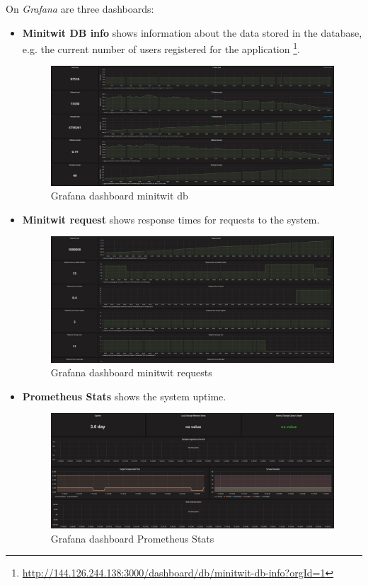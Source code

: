 On \textit{Grafana} are three dashboards:
\begin{itemize}
    \item \textbf{Minitwit DB info} shows information about the data stored in the database, e.g. the current number of users registered for the application \footnote{\url{http://144.126.244.138:3000/dashboard/db/minitwit-db-info?orgId=1}}.
    \begin{figure}[H]
        \centering
        \includegraphics[width=1.0\textwidth]{images/Grafana_minitwit_db.JPG}
        \caption{Grafana dashboard minitwit db}
        \label{fig:grafana_db}
    \end{figure}
    
    \item \textbf{Minitwit request} shows response times for requests to the system.
    \begin{figure}[H]
        \centering
        \includegraphics[width=1.0\textwidth]{images/Grafana_minitwit_requests.JPG}
        \caption{Grafana dashboard minitwit requests}
        \label{fig:grafana_requests}
    \end{figure}
    
    \item \textbf{Prometheus Stats} shows the system uptime.
    \begin{figure}[H]
        \centering
        \includegraphics[width=1.0\textwidth]{images/Grafana_prometheous_stats.JPG}
        \caption{Grafana dashboard Prometheus Stats}
        \label{fig:grafana_prometheus}
    \end{figure}
\end{itemize}
